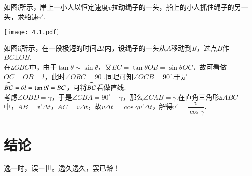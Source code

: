 \begin{example}
	如图i所示，岸上一小人以恒定速度$v$拉动绳子的一头，船上的小人抓住绳子的另一头，求船速$v'$.
	
	\begin{center}
		\texttt{[image: 4.1.pdf]}
	\end{center}
\end{example}
\begin{solution}
	如图ii所示，在一段极短的时间$\Delta t$内，设绳子的一头从$A$移动到$B$，过点$B$作$BC \bot OB$. \\
	在$\vartriangle OBC$中，由于$\tan \theta \sim \sin \theta$，又$BC = \tan \theta OB = \sin \theta OC$，故可看做$OC=OB=l$，此时$\angle OBC = 90^{\circ}$.同理可知$\angle OCB = 90^{\circ}$.于是$\overset{\LARGE{\frown}}{BC} = \theta l = \tan \theta l = BC$，可将$\overset{\LARGE{\frown}}{BC}$看做直线. \\
	考虑$\angle OBD=\gamma$，于是$\angle CBA=90^{\circ} - \gamma$，那么$\angle CAB = \gamma$.在直角三角形$\vartriangle ABC$中，$AB = v' \Delta t$，$AC = v \Delta t$，故$v \Delta t = \cos \gamma v' \Delta t$，解得$v' = \dfrac{v}{\cos \gamma}$.
\end{solution}







\chapter*{结\quad 论}

逸一时，误一世。逸久逸久，罢已龄！

